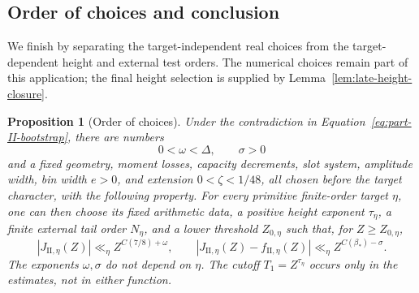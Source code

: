 \documentclass[11pt,a4paper]{article}
\numberwithin{equation}{section}
\numberwithin{figure}{section}
\newtheorem{proposition}[theorem]{Proposition}
\theoremstyle{definition}
\theoremstyle{remark}
\begin{document}
\subsection{Order of choices and conclusion}

We finish by separating the target-independent real choices from the
target-dependent height and external test orders.  The numerical choices
remain part of this application; the final height selection is supplied by
Lemma~\ref{lem:late-height-closure}.

\begin{proposition}[Order of choices]\label{prop:parameter-order}
Under the contradiction in Equation~\eqref{eq:part-II-bootstrap}, there
are numbers
\[
 0<\omega<\Delta,\qquad \sigma>0
\]
and a fixed geometry, moment losses, capacity decrements, slot system,
amplitude width, bin width \(e>0\), and extension \(0<\zeta<1/48\),
all chosen before the target character, with the following property.
For every primitive finite-order target \(\eta\), one can then choose
its fixed arithmetic data, a positive height exponent \(\tau_\eta\),
a finite external tail order \(N_\eta\), and a lower threshold
\(Z_{0,\eta}\) such that, for \(Z\ge Z_{0,\eta}\),
\[
 |J_{\mathrm{II},\eta}(Z)|\ll_\eta Z^{C(7/8)+\omega},\qquad
 |J_{\mathrm{II},\eta}(Z)-f_{\mathrm{II},\eta}(Z)|
 \ll_\eta Z^{C(\beta_*)-\sigma}.
\]
The exponents \(\omega,\sigma\) do not depend on \(\eta\).
The cutoff \(T_1=Z^{\tau_\eta}\) occurs only in the estimates,
not in either function.
\end{proposition}
\end{document}
